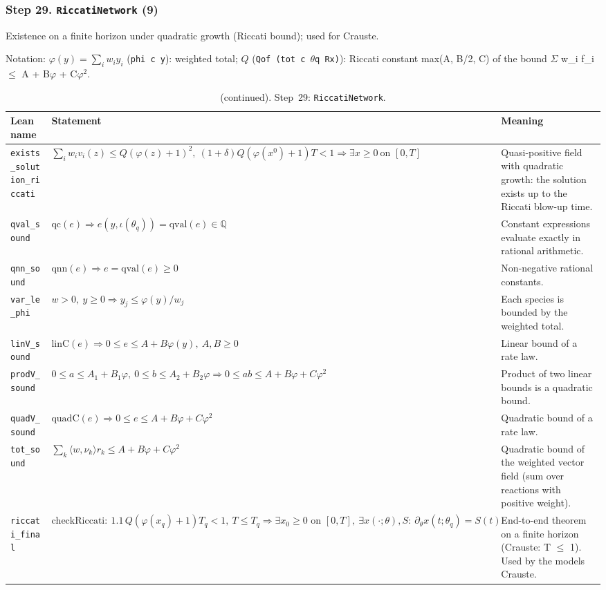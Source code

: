 \subsubsection*{Step 29. \texttt{RiccatiNetwork} (9)}
Existence on a finite horizon under quadratic growth (Riccati bound); used for Crauste.

{\small\raggedright Notation: $\varphi(y)=\sum_iw_iy_i$ (\texttt{phi c y}): weighted total; $Q$ (\texttt{Qof (tot c $\theta$q Rx)}): Riccati constant max(A, B/2, C) of the bound $\Sigma$ w\_i f\_i $\le$ A + B$\varphi$ + C$\varphi^2$.}

\addtocounter{table}{-1}
{\small
\begin{longtable}{@{}>{\raggedright\arraybackslash}p{3.6cm}>{\raggedright\arraybackslash}p{6.6cm}>{\raggedright\arraybackslash}p{5.6cm}@{}}
\caption[]{(continued). Step~29: \texttt{RiccatiNetwork}.}\\
\toprule
Lean name & Statement & Meaning \\
\midrule
\endhead
\texttt{exists\_\allowbreak{}solution\_\allowbreak{}riccati} & $\displaystyle \sum_iw_iv_i(z)\le Q(\varphi(z)+1)^2,\ (1+\delta)Q(\varphi(x^0)+1)T<1\Rightarrow\exists x\ge0\ \text{on }[0,T]$ & Quasi-positive field with quadratic growth: the solution exists up to the Riccati blow-up time. \\[3pt]
\texttt{qval\_\allowbreak{}sound} & $\displaystyle \mathrm{qc}(e)\Rightarrow e(y,\iota(\theta_q))=\mathrm{qval}(e)\in\mathbb{Q}$ & Constant expressions evaluate exactly in rational arithmetic. \\[3pt]
\texttt{qnn\_\allowbreak{}sound} & $\displaystyle \mathrm{qnn}(e)\Rightarrow e=\mathrm{qval}(e)\ge0$ & Non-negative rational constants. \\[3pt]
\texttt{var\_\allowbreak{}le\_\allowbreak{}phi} & $\displaystyle w>0,\ y\ge0\Rightarrow y_j\le\varphi(y)/w_j$ & Each species is bounded by the weighted total. \\[3pt]
\texttt{linV\_\allowbreak{}sound} & $\displaystyle \mathrm{linC}(e)\Rightarrow0\le e\le A+B\varphi(y),\ A,B\ge0$ & Linear bound of a rate law. \\[3pt]
\texttt{prodV\_\allowbreak{}sound} & $\displaystyle 0\le a\le A_1+B_1\varphi,\ 0\le b\le A_2+B_2\varphi\Rightarrow0\le ab\le A+B\varphi+C\varphi^2$ & Product of two linear bounds is a quadratic bound. \\[3pt]
\texttt{quadV\_\allowbreak{}sound} & $\displaystyle \mathrm{quadC}(e)\Rightarrow0\le e\le A+B\varphi+C\varphi^2$ & Quadratic bound of a rate law. \\[3pt]
\texttt{tot\_\allowbreak{}sound} & $\displaystyle \sum_k\langle w,\nu_k\rangle r_k\le A+B\varphi+C\varphi^2$ & Quadratic bound of the weighted vector field (sum over reactions with positive weight). \\[3pt]
\texttt{riccati\_\allowbreak{}final} & $\displaystyle \mathrm{checkRiccati}:\ 1.1\,Q(\varphi(x_q)+1)T_q<1,\ T\le T_q\Rightarrow\exists x_0\ge0\text{ on }[0,T],\ \exists x(\cdot;\theta),S:\ \partial_\theta x(t;\theta_q)=S(t)$ & End-to-end theorem on a finite horizon (Crauste: T $\le$ 1). Used by the models Crauste. \\[3pt]
\bottomrule
\end{longtable}
}

